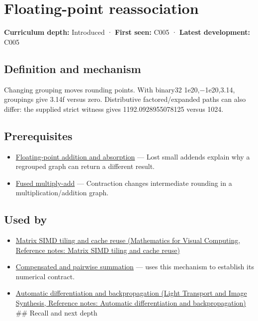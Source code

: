 \hypertarget{appendix-c2ac4a84c283}{}\label{referencestart:appendix-c2ac4a84c283}
\section{Floating-point reassociation}\label{appendix-c2ac4a84c283-floating-point-reassociation}

\textbf{Curriculum depth:} Introduced · \textbf{First seen:} C005 · \textbf{Latest development:} C005

\subsection{Definition and mechanism}\label{appendix-c2ac4a84c283-definition-and-mechanism}

Changing grouping moves rounding points. With binary32 1e20,−1e20,3.14, groupings give 3.14f versus zero. Distributive factored/expanded paths can also differ: the supplied strict witness gives 1192.0928955078125 versus 1024.

\subsection{Prerequisites}\label{appendix-c2ac4a84c283-prerequisites}

\begin{itemize}
\tightlist
\item
  \hyperref[appendix-a1b1b4580dfd]{Floating-point addition and absorption} --- Lost small addends explain why a regrouped graph can return a different result.
\item
  \hyperref[appendix-41e8ef22a21e]{Fused multiply-add} --- Contraction changes intermediate rounding in a multiplication/addition graph.
\end{itemize}

\subsection{Used by}\label{appendix-c2ac4a84c283-used-by}

\begin{itemize}
\item
  \href{../02-Mathematics-for-Visual-Computing/main.pdf\#nameddest=appendix-1bfb7c657105}{Matrix SIMD tiling and cache reuse (Mathematics for Visual Computing, Reference notes: Matrix SIMD tiling and cache reuse)}
\item
  \hyperref[appendix-df318da57389]{Compensated and pairwise summation} --- uses this mechanism to establish its numerical contract.
\item
  \href{../04-Light-Transport-and-Image-Synthesis/main.pdf\#nameddest=appendix-40df0855b4a7}{Automatic differentiation and backpropagation (Light Transport and Image Synthesis, Reference notes: Automatic differentiation and backpropagation)} \#\# Recall and next depth
\end{itemize}

